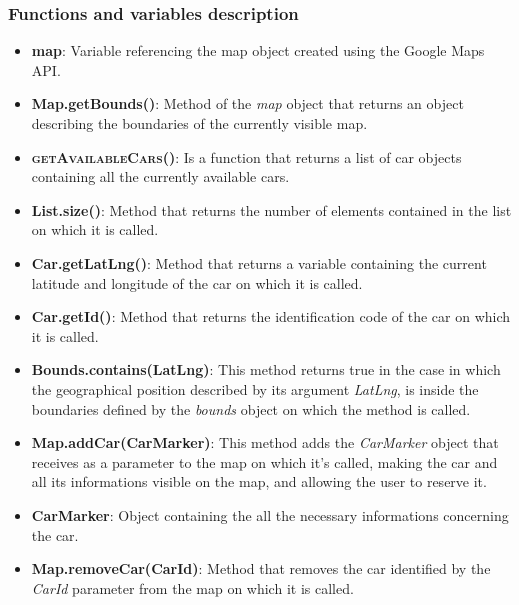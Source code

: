 \subsubsection{Functions and variables description}
\begin{itemize}
	\item \textbf{map}: Variable referencing the map object created using the Google Maps API.
	\item \textbf{Map.getBounds()}: Method of the \textit{map} object that returns an object describing
                                  the boundaries of the currently visible map.
	\item \textsc{\textbf{getAvailableCars()}}: Is a function that returns a list of car objects
                                              containing all the currently available cars.
	\item \textbf{List.size()}: Method that returns the number of elements contained in the list on which
                              it is called.
	\item \textbf{Car.getLatLng()}: Method that returns a variable containing the current latitude and
                                  longitude of the car on which it is called.
	\item \textbf{Car.getId()}: Method that returns the identification code of the car on which it is
                              called.
	\item \textbf{Bounds.contains(LatLng)}: This method returns true in the case in which the
                                          geographical position described by its argument
                                          \textit{LatLng}, is inside the boundaries defined by
                                          the \textit{bounds} object on which the method is called.
	\item \textbf{Map.addCar(CarMarker)}: This method adds the \textit{CarMarker} object that receives
                                        as a parameter to the map on which it's called, making the car
                                        and all its informations visible on the map, and allowing the
                                        user to reserve it.
	\item \textbf{CarMarker}: Object containing the all the necessary informations concerning the car.
	\item \textbf{Map.removeCar(CarId)}: Method that removes the car identified by the \textit{CarId}
                                       parameter from the map on which it is called.
\end{itemize}

\pagebreak
